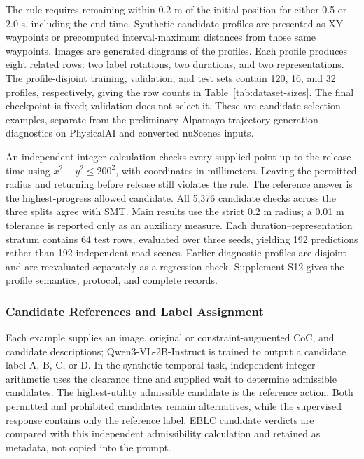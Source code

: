 \documentclass[nolineno]{ieeeaccess}
\begin{document}
The rule requires remaining within 0.2 m of the initial position for either 0.5 or 2.0 s, including the end time. Synthetic candidate profiles are presented as XY waypoints or precomputed interval-maximum distances from those same waypoints. Images are generated diagrams of the profiles. Each profile produces eight related rows: two label rotations, two durations, and two representations. The profile-disjoint training, validation, and test sets contain 120, 16, and 32 profiles, respectively, giving the row counts in Table~\ref{tab:dataset-sizes}. The final checkpoint is fixed; validation does not select it. These are candidate-selection examples, separate from the preliminary Alpamayo trajectory-generation diagnostics on PhysicalAI and converted nuScenes inputs.\par

An independent integer calculation checks every supplied point up to the release time using $x^2+y^2\leq 200^2$, with coordinates in millimeters. Leaving the permitted radius and returning before release still violates the rule. The reference answer is the highest-progress allowed candidate. All 5,376 candidate checks across the three splits agree with SMT. Main results use the strict 0.2 m radius; a 0.01 m tolerance is reported only as an auxiliary measure. Each duration--representation stratum contains 64 test rows, evaluated over three seeds, yielding 192 predictions rather than 192 independent road scenes. Earlier diagnostic profiles are disjoint and are reevaluated separately as a regression check. Supplement S12 gives the profile semantics, protocol, and complete records.\par

\subsubsection{Candidate References and Label Assignment}

Each example supplies an image, original or constraint-augmented CoC, and candidate descriptions; Qwen3-VL-2B-Instruct is trained to output a candidate label A, B, C, or D. In the synthetic temporal task, independent integer arithmetic uses the clearance time and supplied wait to determine admissible candidates. The highest-utility admissible candidate is the reference action. Both permitted and prohibited candidates remain alternatives, while the supervised response contains only the reference label. EBLC candidate verdicts are compared with this independent admissibility calculation and retained as metadata, not copied into the prompt.\par
\end{document}
